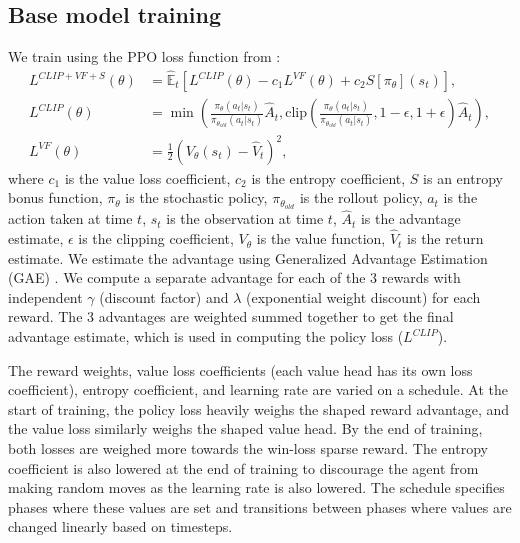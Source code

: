 \documentclass{article}
\begin{document}
\subsection{Base model training}
We train using the PPO loss function from \citet{DBLP:journals/corr/SchulmanWDRK17}:
\begin{align}
    L^{CLIP+VF+S}(\theta) &= \hat{\mathbb{E}}_t \left[ L^{CLIP}(\theta) - c_1 L^{VF}(\theta) + c_2 S\left[\pi_\theta\right](s_t) \right], \\
    L^{CLIP}(\theta) &= \min \left( \frac{\pi_\theta(a_t|s_t)}{\pi_{\theta_{old}}(a_t|s_t)} \hat{A}_t, \text{clip}\left( \frac{\pi_\theta(a_t|s_t)}{\pi_{\theta_{old}}(a_t|s_t)}, 1-\epsilon, 1+\epsilon \right) \hat{A}_t \right), \\
    L^{VF}(\theta) &= \frac{1}{2} \left( V_\theta(s_t) - \hat{V}_t \right)^2,
\end{align}
where $c_1$ is the value loss coefficient, $c_2$ is the entropy coefficient, $S$ is an
entropy bonus function, $\pi_\theta$ is the stochastic policy, $\pi_{\theta_{old}}$ is the rollout policy, $a_t$
is the action taken at time $t$, $s_t$ is the observation at time $t$, $\hat{A}_t$
is the advantage estimate,  $\epsilon$ is the clipping coefficient, $V_\theta$ is the
value function, $\hat{V}_t$ is the return estimate. We estimate the advantage
using Generalized Advantage Estimation (GAE) \citep{DBLP:journals/corr/SchulmanMLJA15}.
We compute a separate advantage for each of the 3 rewards with independent $\gamma$
(discount factor) and $\lambda$ (exponential weight discount) for each reward. The 3 
advantages are weighted summed together to get the final advantage estimate, which is
used in computing the policy loss ($L^{CLIP}$).

The reward weights, value loss coefficients (each value
head has its own loss coefficient), entropy coefficient, and learning rate are varied on
a schedule. At the start of training, the policy loss heavily weighs the shaped 
reward advantage, and the value loss similarly weighs the shaped value head. By the end
of training, both losses are weighed more towards the win-loss sparse reward. The entropy coefficient is also
lowered at the end of training to discourage the agent from making random moves as the
learning rate is also lowered. The schedule specifies phases where these values are set and
transitions between phases where values are changed linearly based on timesteps.
\end{document}
